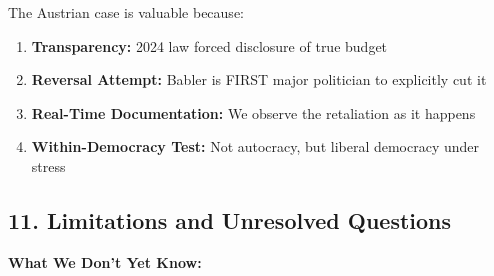 The Austrian case is valuable because:
\begin{enumerate}
\item \textbf{Transparency:} 2024 law forced disclosure of true budget
\item \textbf{Reversal Attempt:} Babler is FIRST major politician to explicitly cut it
\item \textbf{Real-Time Documentation:} We observe the retaliation as it happens
\item \textbf{Within-Democracy Test:} Not autocracy, but liberal democracy under stress
\end{enumerate}

\label{sec:dx-critical}

\subsection*{11. Limitations and Unresolved Questions}

\textbf{What We Don't Yet Know:}

